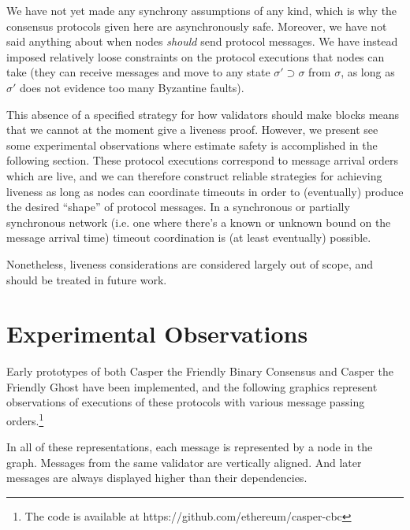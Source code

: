\documentclass{article}
\theoremstyle{definition}
\begin{document}
We have not yet made any synchrony assumptions of any kind, which is why the consensus protocols given here are asynchronously safe. Moreover, we have not said anything about when nodes \emph{should} send protocol messages. We have instead imposed relatively loose constraints on the protocol executions that nodes can take (they can receive messages and move to any state $\sigma' \supset \sigma$ from $\sigma$, as long as $\sigma'$ does not evidence too many Byzantine faults).

This absence of a specified strategy for how validators should make blocks means that we cannot at the moment give a liveness proof. However, we present see some experimental observations where estimate safety is accomplished in the following section. These protocol executions correspond to message arrival orders which are live, and we can therefore construct reliable strategies for achieving liveness as long as nodes can coordinate timeouts in order to (eventually) produce the desired ``shape'' of protocol messages. In a synchronous or partially synchronous network (i.e. one where there's a known or unknown bound on the message arrival time) timeout coordination is (at least eventually) possible.

Nonetheless, liveness considerations are considered largely out of scope, and should be treated in future work.

\pagebreak
\section{Experimental Observations}

Early prototypes of both Casper the Friendly Binary Consensus and Casper the Friendly Ghost have been implemented, and the following graphics represent observations of executions of these protocols with various message passing orders.\footnote{The code is available at https://github.com/ethereum/casper-cbc}

In all of these representations, each message is represented by a node in the graph. Messages from the same validator are vertically aligned. And later messages are always displayed higher than their dependencies.
\end{document}
